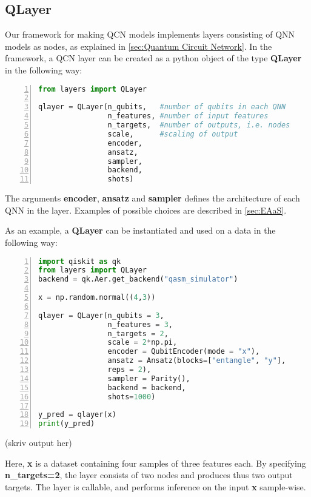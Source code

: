 \subsection{QLayer}\label{sec:QLayer}

Our framework for making QCN models implements layers consisting of QNN models as nodes, as explained in \autoref{sec:Quantum Circuit Network}. In the framework, a QCN layer can be created as a python object of the type \textbf{QLayer} in the following way:

\begin{lstlisting}[language=python, numbers=left]
from layers import QLayer

qlayer = QLayer(n_qubits,   #number of qubits in each QNN
                n_features, #number of input features
                n_targets,  #number of outputs, i.e. nodes
                scale,      #scaling of output
                encoder,
                ansatz,
                sampler,
                backend,
                shots)
\end{lstlisting}

The arguments \textbf{encoder}, \textbf{ansatz} and \textbf{sampler} defines the architecture of each QNN in the layer. Examples of possible choices are described in \autoref{sec:EAaS}. 

As an example, a \textbf{QLayer} can be instantiated and used on a data in the following way:


\begin{lstlisting}[language=python, numbers=left]
import qiskit as qk
from layers import QLayer
backend = qk.Aer.get_backend("qasm_simulator")

x = np.random.normal((4,3))

qlayer = QLayer(n_qubits = 3,
                n_features = 3,
                n_targets = 2,
                scale = 2*np.pi,
                encoder = QubitEncoder(mode = "x"),
                ansatz = Ansatz(blocks=["entangle", "y"],
                reps = 2),
                sampler = Parity(),
                backend = backend,
                shots=1000)
                
y_pred = qlayer(x)
print(y_pred)
\end{lstlisting}
(skriv output her)

Here, \textbf{x} is a dataset containing four samples of three features each. By specifying \textbf{n\_targets=2}, the layer consists of two nodes and produces thus two output targets. The layer is callable, and performs inference on the input \textbf{x} sample-wise.

